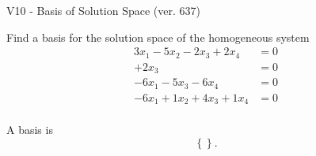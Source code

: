 \begin{exercise}
  \begin{exerciseTitle}V10 - Basis of Solution Space (ver. 637)\end{exerciseTitle}
  \begin{exerciseStatement}
    Find a basis for the solution space of the homogeneous system 
\begin{align*}
 3 x_ 1 -5 x_ 2 -2 x_ 3 + 2 x_ 4 &= 0  \\ 
  + 2 x_ 3 &= 0  \\ 
  -6 x_ 1 -5 x_ 3 -6 x_ 4 &= 0  \\ 
  -6 x_ 1 + 1 x_ 2 + 4 x_ 3 + 1 x_ 4 &= 0  \\ 
 \end{align*}


 
  \end{exerciseStatement}

  \begin{exerciseAnswer}
   A basis is   
\[\left\{\right\}.\]

  


  \end{exerciseAnswer}
\end{exercise}